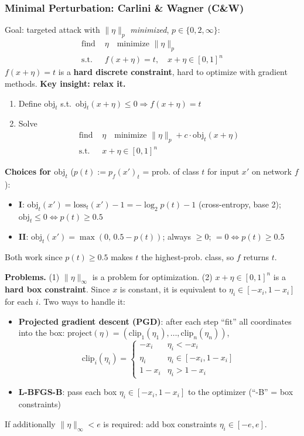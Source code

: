 \subsubsection{Minimal Perturbation: Carlini \& Wagner (C\&W)}
Goal: targeted attack with $\|\eta\|_p$ \emph{minimized}, $p \in \{0, 2, \infty\}$:
\[
  \begin{aligned}
    \text{find } & \eta \quad \text{minimize } \|\eta\|_p \\
    \text{s.t. } & f(x+\eta) = t, \quad x + \eta \in [0,1]^n
  \end{aligned}
\]
$f(x+\eta) = t$ is a \textbf{hard discrete constraint},
hard to optimize with gradient methods. \textbf{Key insight: relax it.}
\begin{enumerate}
  \item Define $\text{obj}_t$ s.t.\ $\text{obj}_t(x+\eta) \le 0 \Rightarrow f(x+\eta) = t$
  \item Solve
    \[
      \begin{aligned}
        \text{find } & \eta \quad \text{minimize } \|\eta\|_p + c \cdot \text{obj}_t(x+\eta) \\
        \text{s.t. } & x + \eta \in [0,1]^n
      \end{aligned}
    \]
\end{enumerate}
\textbf{Choices for $\text{obj}_t$} ($p(t) := p_f(x')_t$ = prob. of class $t$ for input $x'$ on network $f$):
\begin{itemize}
  \item \textbf{I}: $\text{obj}_t(x') = \text{loss}_t(x') - 1 = -\log_2 p(t) - 1$ (cross-entropy, base 2);
    $\text{obj}_t \le 0 \iff p(t) \ge 0.5$
  \item \textbf{II}: $\text{obj}_t(x') = \max(0,\, 0.5 - p(t))$; always $\ge 0$; $= 0 \iff p(t) \ge 0.5$
\end{itemize}
Both work since $p(t) \ge 0.5$ makes $t$ the highest-prob. class, so $f$ returns $t$.

\textbf{Problems.}
(1) $\|\eta\|_\infty$ is a problem for optimization.
(2) $x + \eta \in [0,1]^n$ is a \textbf{hard box constraint}. Since $x$ is constant, it is equivalent to
$\eta_i \in [-x_i, 1 - x_i]$ for each $i$. Two ways to handle it:
\begin{itemize}
  \item \textbf{Projected gradient descent (PGD)}: after each step ``fit'' all coordinates into the box:
    $\text{project}(\eta) = (\text{clip}_1(\eta_1), \dots, \text{clip}_n(\eta_n))$,
    \[
      \text{clip}_i(\eta_i) =
      \begin{cases}
        -x_i & \eta_i < -x_i \\
        \eta_i & \eta_i \in [-x_i, 1-x_i] \\
        1 - x_i & \eta_i > 1 - x_i
      \end{cases}
    \]
  \item \textbf{L-BFGS-B}: pass each box $\eta_i \in [-x_i, 1-x_i]$ to the optimizer (``-B'' = box constraints)
\end{itemize}
If additionally $\|\eta\|_\infty < e$ is required: add box constraints $\eta_i \in [-e, e]$.

